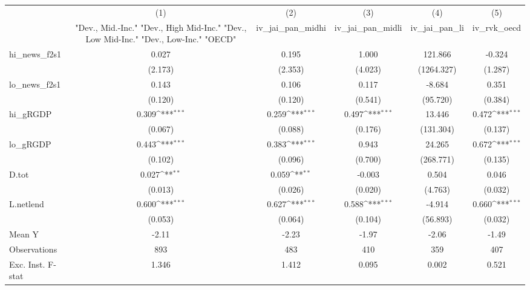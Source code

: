 {
\def\sym#1{\ifmmode^{#1}\else\(^{#1}\)\fi}
\begin{tabular}{l*{5}{c}}
\toprule
            &\multicolumn{1}{c}{(1)}&\multicolumn{1}{c}{(2)}&\multicolumn{1}{c}{(3)}&\multicolumn{1}{c}{(4)}&\multicolumn{1}{c}{(5)}\\
            &\multicolumn{1}{c}{ "Dev., Mid.-Inc." "Dev., High Mid-Inc." "Dev., Low Mid-Inc." "Dev., Low-Inc." "OECD" }&\multicolumn{1}{c}{iv\_jai\_pan\_midhi}&\multicolumn{1}{c}{iv\_jai\_pan\_midli}&\multicolumn{1}{c}{iv\_jai\_pan\_li}&\multicolumn{1}{c}{iv\_rvk\_oecd}\\
\midrule
hi\_news\_f2s1&       0.027         &       0.195         &       1.000         &     121.866         &      -0.324         \\
            &     (2.173)         &     (2.353)         &     (4.023)         &  (1264.327)         &     (1.287)         \\
\addlinespace
lo\_news\_f2s1&       0.143         &       0.106         &       0.117         &      -8.684         &       0.351         \\
            &     (0.120)         &     (0.120)         &     (0.541)         &    (95.720)         &     (0.384)         \\
\addlinespace
hi\_gRGDP    &       0.309\sym{***}&       0.259\sym{***}&       0.497\sym{***}&      13.446         &       0.472\sym{***}\\
            &     (0.067)         &     (0.088)         &     (0.176)         &   (131.304)         &     (0.137)         \\
\addlinespace
lo\_gRGDP    &       0.443\sym{***}&       0.383\sym{***}&       0.943         &      24.265         &       0.672\sym{***}\\
            &     (0.102)         &     (0.096)         &     (0.700)         &   (268.771)         &     (0.135)         \\
\addlinespace
D.tot       &       0.027\sym{**} &       0.059\sym{**} &      -0.003         &       0.504         &       0.046         \\
            &     (0.013)         &     (0.026)         &     (0.020)         &     (4.763)         &     (0.032)         \\
\addlinespace
L.netlend   &       0.600\sym{***}&       0.627\sym{***}&       0.588\sym{***}&      -4.914         &       0.660\sym{***}\\
            &     (0.053)         &     (0.064)         &     (0.104)         &    (56.893)         &     (0.032)         \\
\midrule
Mean Y      &       -2.11         &       -2.23         &       -1.97         &       -2.06         &       -1.49         \\
Observations&         893         &         483         &         410         &         359         &         407         \\
Exc. Inst. F-stat&       1.346         &       1.412         &       0.095         &       0.002         &       0.521         \\
\bottomrule
\end{tabular}
}
